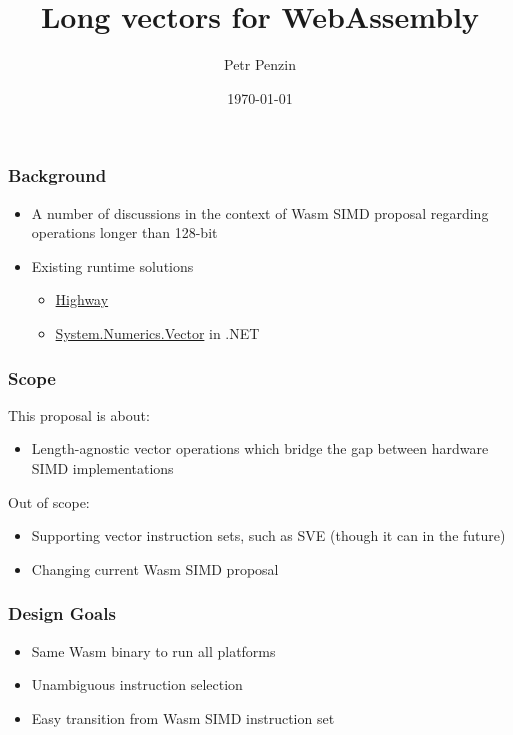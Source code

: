\documentclass[t,aspectratio=169, xcolor={table}]{beamer}
\title{Long vectors for WebAssembly}
\author{Petr Penzin}
\institute{Intel Corporation}
\date{\today}
\begin{document}
\begin{frame}
  \titlepage
\end{frame}
\begin{frame}
\frametitle{Background}
  \begin{itemize}
  \item A number of discussions in the context of Wasm SIMD proposal regarding operations longer than 128-bit\footnotemark[1]\footnotemark[2]
  \item Existing runtime solutions
    \begin{itemize}
    \item \href{https://github.com/google/highway}{Highway}
    \item \href{https://docs.microsoft.com/en-us/dotnet/api/system.numerics.vector}{System.Numerics.Vector} in .NET
    \end{itemize}
  \end{itemize}
\end{frame}
\begin{frame}
\frametitle{Scope}
  This proposal is about:

  \begin{itemize}
  \item Length-agnostic vector operations which bridge the gap between hardware SIMD implementations
  \end{itemize}

  Out of scope:

  \begin{itemize}
  \item Supporting vector instruction sets, such as SVE (though it can in the future)
  \item Changing current Wasm SIMD proposal
  \end{itemize}
\end{frame}
\begin{frame}
\frametitle{Design Goals}
  \begin{itemize}
  \item Same Wasm binary to run all platforms
  \item Unambiguous instruction selection
  \item Easy transition from Wasm SIMD instruction set
  \end{itemize}
\end{frame}
\end{document}
